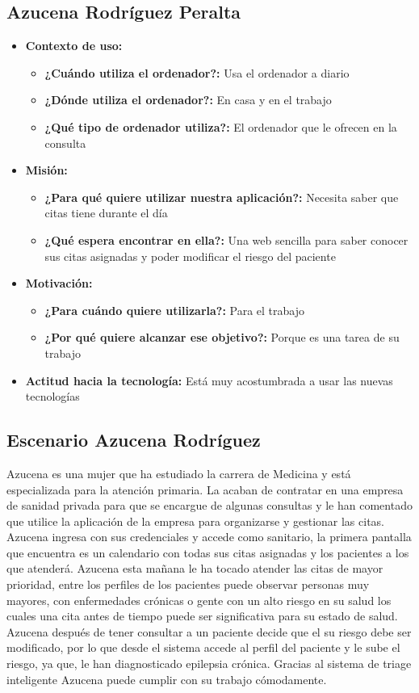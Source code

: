 \subsection{Azucena Rodríguez Peralta}
\begin{itemize}
    \item \textbf{Contexto de uso: }
    \begin{itemize}
        \item \textbf{¿Cuándo utiliza el ordenador?: }  Usa el ordenador a diario
        \item \textbf{¿Dónde utiliza el ordenador?: } En casa y en el trabajo
        \item \textbf{¿Qué tipo de ordenador utiliza?: } El ordenador que le ofrecen en la consulta
    \end{itemize}
    \item \textbf{Misión: }
    \begin{itemize}
        \item \textbf{¿Para qué quiere utilizar nuestra aplicación?: } Necesita saber que citas tiene durante el día
        \item \textbf{¿Qué espera encontrar en ella?: } Una web sencilla para saber conocer sus citas asignadas y poder modificar el riesgo del paciente
    \end{itemize}
    \item \textbf{Motivación: }
    \begin{itemize}
        \item \textbf{¿Para cuándo quiere utilizarla?: } Para el trabajo
        \item \textbf{¿Por qué quiere alcanzar ese objetivo?: } Porque es una tarea de su trabajo
    \end{itemize}
    \item \textbf{Actitud hacia la tecnología: } Está muy acostumbrada a usar las nuevas tecnologías
\end{itemize}

\subsection{Escenario Azucena Rodríguez}
    Azucena es una mujer que ha estudiado la carrera de Medicina y está especializada para la atención primaria.
    La acaban de contratar en una empresa de sanidad privada para que se encargue de algunas consultas y le
    han comentado que utilice la aplicación de la empresa para organizarse y gestionar las citas.
    Azucena ingresa con sus credenciales y accede como sanitario, la primera pantalla que encuentra
    es un calendario con todas sus citas asignadas y los pacientes a los que atenderá.
    Azucena esta mañana le ha tocado atender las citas de mayor prioridad, entre los perfiles de los pacientes
    puede observar personas muy mayores, con enfermedades crónicas o gente con un alto riesgo en su salud los cuales
    una cita antes de tiempo puede ser significativa para su estado de salud.
    Azucena después de tener consultar a un paciente decide que el su riesgo debe ser modificado, por lo que
    desde el sistema accede al perfil del paciente y le sube el riesgo, ya que, le han diagnosticado epilepsia
    crónica. Gracias al sistema de triage inteligente Azucena puede cumplir con su trabajo cómodamente.
